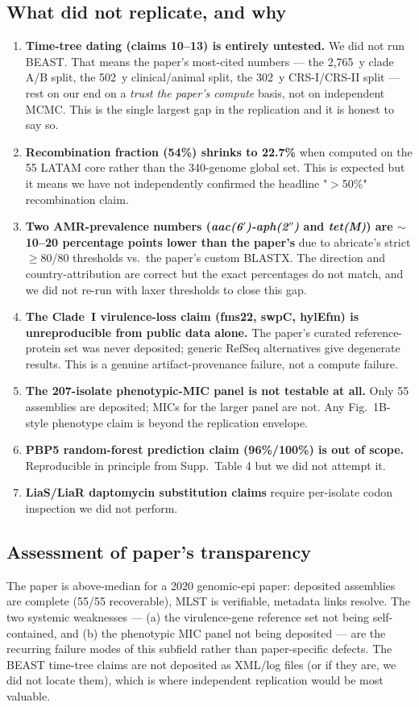 \documentclass[11pt,letterpaper]{article}
\begin{document}
\subsection{What did not replicate, and why}
\begin{enumerate}[leftmargin=1.4em]
  \item \textbf{Time-tree dating (claims 10--13) is entirely untested.} We did not run BEAST. That means the paper's most-cited numbers --- the 2{,}765~y clade A/B split, the 502~y clinical/animal split, the 302~y CRS-I/CRS-II split --- rest on our end on a \emph{trust the paper's compute} basis, not on independent MCMC. This is the single largest gap in the replication and it is honest to say so.
  \item \textbf{Recombination fraction (54\%) shrinks to 22.7\%} when computed on the 55 LATAM core rather than the 340-genome global set. This is expected but it means we have not independently confirmed the headline "$>$50\%" recombination claim.
  \item \textbf{Two AMR-prevalence numbers (\emph{aac(6$'$)-aph(2$''$)} and \emph{tet(M)}) are $\sim$10--20 percentage points lower than the paper's} due to abricate's strict $\geq$80/80 thresholds vs.\ the paper's custom BLASTX. The direction and country-attribution are correct but the exact percentages do not match, and we did not re-run with laxer thresholds to close this gap.
  \item \textbf{The Clade~I virulence-loss claim (fms22, swpC, hylEfm) is unreproducible from public data alone.} The paper's curated reference-protein set was never deposited; generic RefSeq alternatives give degenerate results. This is a genuine artifact-provenance failure, not a compute failure.
  \item \textbf{The 207-isolate phenotypic-MIC panel is not testable at all.} Only 55 assemblies are deposited; MICs for the larger panel are not. Any Fig.~1B-style phenotype claim is beyond the replication envelope.
  \item \textbf{PBP5 random-forest prediction claim (96\%/100\%) is out of scope.} Reproducible in principle from Supp.\ Table 4 but we did not attempt it.
  \item \textbf{LiaS/LiaR daptomycin substitution claims} require per-isolate codon inspection we did not perform.
\end{enumerate}

\subsection{Assessment of paper's transparency}
The paper is above-median for a 2020 genomic-epi paper: deposited assemblies are complete (55/55 recoverable), MLST is verifiable, metadata links resolve. The two systemic weaknesses --- (a) the virulence-gene reference set not being self-contained, and (b) the phenotypic MIC panel not being deposited --- are the recurring failure modes of this subfield rather than paper-specific defects. The BEAST time-tree claims are not deposited as XML/log files (or if they are, we did not locate them), which is where independent replication would be most valuable.
\end{document}
